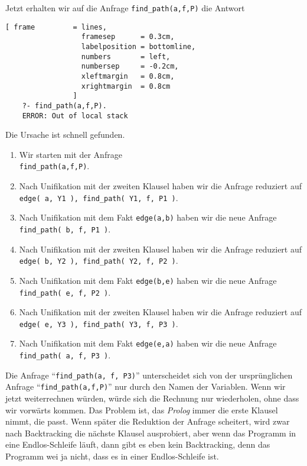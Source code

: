 Jetzt erhalten wir auf die Anfrage \texttt{find\_path(a,f,P)} die Antwort
\begin{Verbatim}[ frame         = lines, 
                  framesep      = 0.3cm, 
                  labelposition = bottomline,
                  numbers       = left,
                  numbersep     = -0.2cm,
                  xleftmargin   = 0.8cm,
                  xrightmargin  = 0.8cm
                ]
    ?- find_path(a,f,P).
    ERROR: Out of local stack
\end{Verbatim}
Die Ursache ist schnell gefunden.
\begin{enumerate}
\item Wir starten mit der Anfrage \\[0.1cm]
      \hspace*{1.3cm} \texttt{find\_path(a,f,P)}.
\item Nach Unifikation mit der zweiten Klausel haben wir die Anfrage reduziert auf \\[0.1cm]
      \hspace*{1.3cm} 
      \texttt{edge( a, Y1 ), find\_path( Y1, f, P1 )}.
\item Nach Unifikation mit dem Fakt \texttt{edge(a,b)} haben wir die neue Anfrage \\[0.1cm]
      \hspace*{1.3cm} 
      \texttt{find\_path( b, f, P1 )}.
\item Nach Unifikation mit der zweiten Klausel haben wir die Anfrage reduziert auf \\[0.1cm]
      \hspace*{1.3cm} 
      \texttt{edge( b, Y2 ), find\_path( Y2, f, P2 )}.
\item Nach Unifikation mit dem Fakt \texttt{edge(b,e)} haben wir die neue Anfrage \\[0.1cm]
      \hspace*{1.3cm} 
      \texttt{find\_path( e, f, P2 )}.
\item Nach Unifikation mit der zweiten Klausel haben wir die Anfrage reduziert auf \\[0.1cm]
      \hspace*{1.3cm} 
      \texttt{edge( e, Y3 ), find\_path( Y3, f, P3 )}.
\item Nach Unifikation mit dem Fakt \texttt{edge(e,a)} haben wir die neue Anfrage \\[0.1cm]
      \hspace*{1.3cm} 
      \texttt{find\_path( a, f, P3 )}.
\end{enumerate}
Die Anfrage ``\texttt{find\_path(a, f, P3)}'' unterscheidet sich von der urspr\"{u}nglichen
Anfrage ``\texttt{find\_path(a,f,P)}'' nur durch den Namen der Variablen.  Wenn wir jetzt
weiterrechnen w\"{u}rden, w\"{u}rde sich die Rechnung nur wiederholen, ohne dass wir vorw\"{a}rts kommen.
Das Problem ist, das \textsl{Prolog} immer die erste
Klausel nimmt, die passt.  Wenn sp\"{a}ter die Reduktion der Anfrage scheitert, wird zwar nach
Backtracking die n\"{a}chste Klausel ausprobiert, aber wenn das Programm in eine
Endlos-Schleife l\"{a}uft, dann gibt es eben kein Backtracking, denn das Programm wei\3 ja
nicht, dass es in einer Endlos-Schleife ist.

